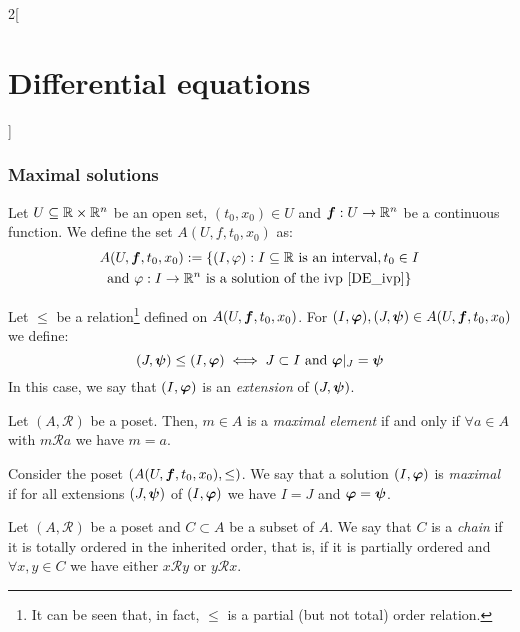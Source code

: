 \documentclass[../../../main.tex]{subfiles}
\begin{document}
\begin{multicols}{2}[\section{Differential equations}]
  \subsubsection*{Maximal solutions}
  \begin{definition}
    Let $U\subseteq\mathbb{R}\times\mathbb{R}^n$ be an open set, $(t_0,x_0)\in U$ and $\boldsymbol{f}:U\rightarrow\mathbb{R}^n$ be a continuous function. We define the set $A(U,f,t_0,x_0)$ as:
    \begin{multline*}
      A(U,\boldsymbol{f},t_0,x_0):=\{(I,\varphi):I\subseteq\mathbb{R}\text{ is an interval},t_0\in I\\\text{and }\varphi:I\rightarrow\mathbb{R}^n\text{ is a solution of the ivp \eqref{DE_ivp}}\}
    \end{multline*}
  \end{definition}
  \begin{definition}
    Let $\leq$ be a relation\footnote{It can be seen that, in fact, $\leq$ is a partial (but not total) order relation.} defined on $A(U,\boldsymbol{f},t_0,x_0)$. For $(I,\boldsymbol{\varphi}),(J,\boldsymbol{\psi})\in A(U,\boldsymbol{f},t_0,x_0)$ we define: $$(J,\boldsymbol{\psi})\leq (I,\boldsymbol{\varphi})\iff J\subset I\text{ and }\boldsymbol{\varphi}|_J=\boldsymbol{\psi}$$ In this case, we say that $(I,\boldsymbol{\varphi})$ is an \textit{extension} of $(J,\boldsymbol{\psi})$.
  \end{definition}
  \begin{definition}
    Let $(A,\mathcal{R})$ be a poset. Then, $m\in A$ is a \textit{maximal element} if and only if $\forall a\in A$ with $m \mathcal{R} a$ we have $m=a$.
  \end{definition}
  \begin{definition}
    Consider the poset $(A(U,\boldsymbol{f},t_0,x_0),\leq)$. We say that a solution $(I,\boldsymbol{\varphi})$ is \textit{maximal} if for all extensions $(J,\boldsymbol{\psi})$ of $(I,\boldsymbol{\varphi})$ we have $I=J$ and $\boldsymbol{\varphi}=\boldsymbol{\psi}$.
  \end{definition}
  \begin{definition}
    Let $(A,\mathcal{R})$ be a poset and $C\subset A$ be a subset of $A$. We say that $C$ is a \textit{chain} if it is totally ordered in the inherited order, that is, if it is partially ordered and $\forall x,y\in C$ we have either $x\mathcal{R}y$ or $y\mathcal{R}x$.
  \end{definition}
  \begin{definition}

\end{definition}
\end{multicols}
\end{document}
